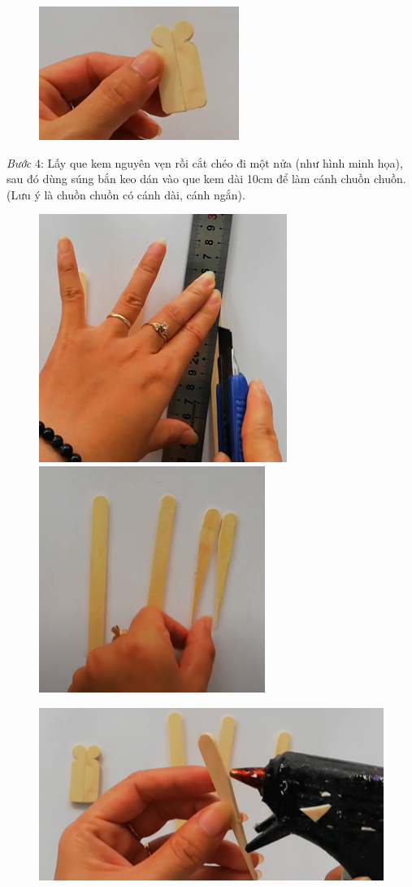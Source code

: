 \begin{multicols}{2}
\begin{figure}[H]
		\vspace*{1pt}
		\hspace*{1pt}\includegraphics[width=0.7\linewidth]{19}
		\vspace*{-10pt}
	\end{figure}
	\textit{Bước} $4$: Lấy que kem nguyên vẹn rồi cắt chéo đi một nửa (như hình minh họa), sau đó dùng súng bắn keo dán vào que kem dài 10cm để làm cánh chuồn chuồn. (Lưu ý là chuồn chuồn có cánh dài, cánh ngắn).
	\begin{figure}[H]
		\vspace*{5pt}
		\centering
		\captionsetup{labelformat= empty, justification=centering}
		\includegraphics[height=0.35\linewidth]{50}
		\includegraphics[height=0.35\linewidth]{51}
		
		\vspace*{1pt}
		\includegraphics[width=0.7\linewidth]{52}
		

\end{figure}
\end{multicols}
